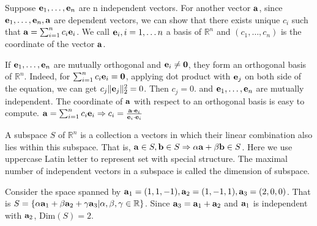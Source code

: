 Suppose $\mathbf{e}_1, \dots, \mathbf{e}_n$ are n independent vectors. For another vector $\mathbf{a}$, since
$\mathbf{e}_1, \dots, \mathbf{e}_n, \mathbf{a}$ are dependent vectors, we can show that there exists unique $c_i$ such that
$\mathbf{a} = \sum_{i=1}^n c_i \mathbf{e}_i$. We call $\mathbf{e}_i, i=1,\dots n$ a basis of $\mathbb{R}^n$ and $(c_1, \dots, c_n)$ is the coordinate of the vector $\mathbf{a}$.

If $\mathbf{e}_1, \dots, \mathbf{e}_n$ are mutually orthogonal and $\mathbf{e}_i \neq \mathbf{0}$, they form an orthogonal basis of $\mathbb{R}^n$. Indeed,  for $\sum_{i=1}^n c_i \mathbf{e}_i = \mathbf{0}$, applying dot product with $\mathbf{e}_j$ on both side of the equation, we can get $ c_j \lVert\mathbf{e}_j\rVert_2^2 = 0 $. Then $c_j = 0$. and $\mathbf{e}_1, \dots, \mathbf{e}_n$ are mutually independent. The coordinate of $\mathbf{a}$ with respect to an orthogonal basis is easy to compute. $\mathbf{a} = \sum_{i=1}^n c_i \mathbf{e}_i \Rightarrow c_i = \frac{\mathbf{a}\cdot \mathbf{e}_i}{\mathbf{e}_i\cdot \mathbf{e}_i}$

A subspace  $S$ of $\mathbb{R}^n$ is a collection a vectors in which their linear combination also lies within this subspace. That is,
$\mathbf{a} \in S, \mathbf{b} \in S \Rightarrow \alpha \mathbf{a} + \beta \mathbf{b} \in S$. Here we use uppercase Latin letter to represent set with special structure.
The maximal number of independent vectors in a subspace is called the dimension of subspace. 
\begin{example}
Consider the space spanned by $\mathbf{a}_1 = (1,1,-1), \mathbf{a}_2=(1,-1,1), \mathbf{a}_3=(2,0,0)$. That is $S=\{\alpha \mathbf{a}_1 + \beta \mathbf{a}_2 + \gamma \mathbf{a}_3 | \alpha, \beta, \gamma \in \mathbb{R}\}$. Since $\mathbf{a}_3 = \mathbf{a}_1 + \mathbf{a}_2$ and $\mathbf{a}_1$ is independent with $\mathbf{a}_2$, $ \mathrm{Dim}(S) = 2$.
\end{example}
